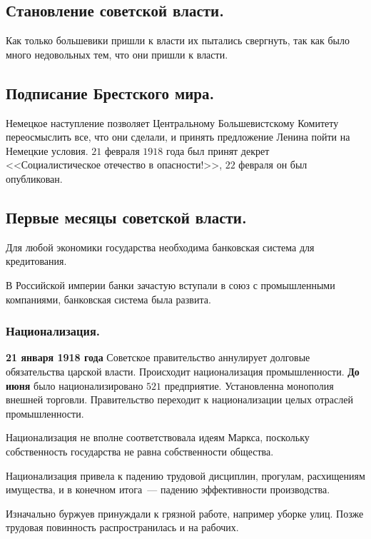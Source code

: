 \documentclass[12pt]{article}
\begin{document}
	\subsection{Становление советской власти.}
	Как только большевики пришли к власти их пытались свергнуть, так как было много недовольных тем, что они пришли к власти.
	\subsection{Подписание Брестского мира.}
	Немецкое наступление позволяет Центральному Большевистскому Комитету переосмыслить все, что они сделали, и принять предложение Ленина пойти на Немецкие условия. $21$ февраля $1918$ года был принят декрет <<Социалистическое отечество в опасности!>>, $22$ февраля он был опубликован.
	\subsection{Первые месяцы советской власти.}
	\begin{note}
		Для любой экономики государства необходима банковская система для кредитования.
	\end{note}
	\begin{note}
		В Российской империи банки зачастую вступали в союз с промышленными компаниями, банковская система была развита.
	\end{note}
	\subsubsection{Национализация.}
	\begin{definition}
		\textbf{21 января 1918 года} Советское правительство аннулирует долговые обязательства царской власти. Происходит национализация промышленности. \textbf{До июня} было национализировано $521$ предприятие. Установленна монополия внешней торговли. Правительство переходит к национализации целых отраслей промышленности.
	\end{definition}
	\begin{note}
		Национализация не вполне соответствовала идеям Маркса, поскольку собственность государства не равна собственности общества.
	\end{note}
	Национализация привела к падению трудовой дисциплин, прогулам, расхищениям имущества, и в конечном итога~--- падению эффективности производства.
	\begin{definition}
		Изначально буржуев принуждали к грязной работе, например уборке улиц. Позже трудовая повинность распространилась и на рабочих.
	\end{definition}
\end{document}
